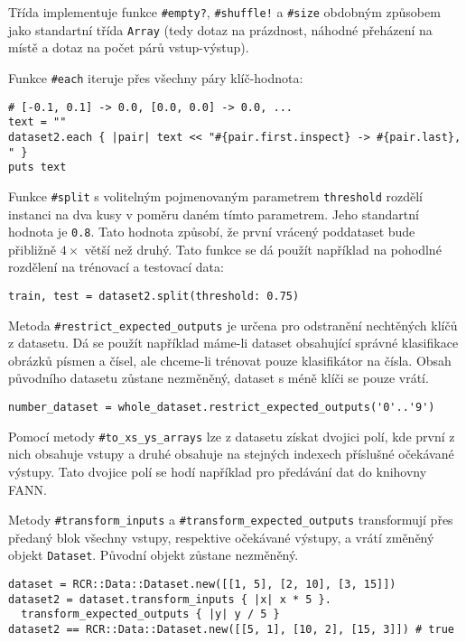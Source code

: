 \documentclass[a4paper]{article}
\begin{document}
Třída implementuje funkce \texttt{\#empty?}, \texttt{\#shuffle!} a
\texttt{\#size} obdobným způsobem jako standartní třída \texttt{Array}
(tedy dotaz na prázdnost, náhodné přeházení na místě a dotaz na počet párů
vstup-výstup).

Funkce \texttt{\#each} iteruje přes všechny páry klíč-hodnota:
\begin{lstlisting}
# [-0.1, 0.1] -> 0.0, [0.0, 0.0] -> 0.0, ...
text = ""
dataset2.each { |pair| text << "#{pair.first.inspect} -> #{pair.last}, " }
puts text
\end{lstlisting}

Funkce \texttt{\#split} s volitelným pojmenovaným parametrem \texttt{threshold}
rozdělí instanci na dva kusy v poměru daném tímto parametrem. Jeho standartní
hodnota je \texttt{0.8}. Tato hodnota způsobí, že první vrácený poddataset bude
přibližně $4\times$ větší než druhý.
Tato funkce se dá použít například na pohodlné rozdělení na trénovací a
testovací data:
\begin{lstlisting}
train, test = dataset2.split(threshold: 0.75)
\end{lstlisting}

Metoda \texttt{\#restrict\_expected\_outputs} je určena pro odstranění nechtěných klíčů
z datasetu. Dá se použít například máme-li dataset obsahující správné klasifikace
obrázků písmen a čísel, ale chceme-li trénovat pouze klasifikátor na čísla.
Obsah původního datasetu zůstane nezměněný, dataset s méně klíči se pouze vrátí.
\begin{lstlisting}
number_dataset = whole_dataset.restrict_expected_outputs('0'..'9')
\end{lstlisting}

Pomocí metody \texttt{\#to\_xs\_ys\_arrays} lze z datasetu získat dvojici polí,
kde první z nich obsahuje vstupy a druhé obsahuje na stejných indexech příslušné
očekávané výstupy. Tato dvojice polí se hodí například pro předávání dat do
knihovny FANN.

Metody \texttt{\#transform\_inputs} a \texttt{\#transform\_expected\_outputs} transformují
přes předaný blok všechny vstupy, respektive očekávané výstupy, a vrátí změněný
objekt \texttt{Dataset}. Původní objekt zůstane nezměněný.
\begin{lstlisting}
dataset = RCR::Data::Dataset.new([[1, 5], [2, 10], [3, 15]])
dataset2 = dataset.transform_inputs { |x| x * 5 }.
  transform_expected_outputs { |y| y / 5 }
dataset2 == RCR::Data::Dataset.new([[5, 1], [10, 2], [15, 3]]) # true
\end{lstlisting}
\end{document}
